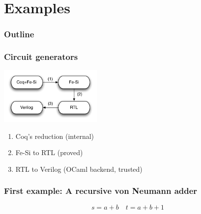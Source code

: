 \documentclass[9pt]{beamer}
\begin{document}
\section{Examples}

\begin{frame}
  \frametitle{Outline}       
  \tableofcontents[currentsection] 
\end{frame}

\begin{frame}
  \frametitle{Circuit generators}
  \begin{center}
    \includegraphics[width=5cm]{figs/examples.pdf}
  \end{center}
  \begin{enumerate}
  \item Coq's reduction (internal)
  \item Fe-Si to RTL (proved)
  \item RTL to Verilog (OCaml backend, trusted)
  \end{enumerate}
\end{frame}

\begin{frame}[fragile]
\frametitle{First example: A recursive von Neumann adder}
\begin{center}
\end{center}
\begin{displaymath}
  s =  a + b \quad  t =  a + b + 1
\end{displaymath}
\end{frame}
\end{document}
